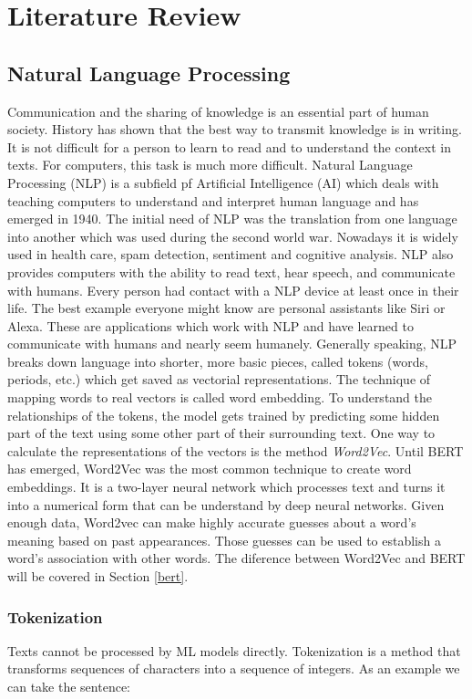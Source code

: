 \chapter{Literature Review} \label{chapter:literaturereview}

\section{Natural Language Processing}
\alert{Communication and the sharing of knowledge is an essential part of human society. History has shown that the best way to transmit knowledge is in writing. It is not difficult for a person to learn to read and to understand the context in texts. For computers, this task is much more difficult. Natural Language Processing (NLP) is a subfield pf Artificial Intelligence (AI) which deals with teaching computers to understand and interpret human language and has emerged in 1940. The initial need of NLP was the translation from one language into another which was used during the second world war. Nowadays it is widely used in health care, spam detection, sentiment and cognitive analysis. NLP also provides computers with the ability to read text, hear speech, and communicate with humans. Every person had contact with a NLP device at least once in their life. The best example everyone might know are personal assistants like Siri or Alexa. These are applications which work with NLP and have learned to communicate with humans and nearly seem humanely.\newline
Generally speaking, NLP breaks down language into shorter, more basic pieces, called tokens (words, periods, etc.) which get saved as vectorial representations. The technique of mapping words to real vectors is called word embedding. To understand the relationships of the tokens, the model gets trained by predicting some hidden part of the text using some other part of their surrounding text. One way to calculate the representations of the vectors is the method \textit{Word2Vec}. Until BERT has emerged, Word2Vec was the most common technique to create word embeddings. It is a two-layer neural network which processes text and turns it into a numerical form that can be understand by deep neural networks. Given enough data, Word2vec can make highly accurate guesses about a word’s meaning based on past appearances. Those guesses can be used to establish a word’s association with other words. The diference between Word2Vec and BERT will be covered in Section \ref{bert}}.

\subsection{Tokenization}
Texts cannot be processed by ML models directly. Tokenization is a method that transforms sequences of characters into a sequence of integers. As an example we can take the sentence: \newline

